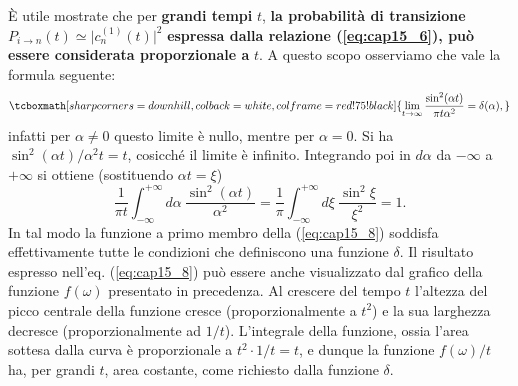 \documentclass[a4paper,12pt,oneside]{book}
\begin{document}
È utile mostrate che per \textbf{grandi tempi} $t$, \textbf{la probabilità di transizione} $P_{i\rightarrow n} (t) \simeq \vert c_n ^{(1)} (t) \vert ^2$ \textbf{espressa dalla relazione (\ref{eq:cap15_6}), può essere considerata proporzionale a } $t$. A questo scopo osserviamo che vale la formula seguente:
	\begin{equation}
		\tcboxmath[sharp corners=downhill, colback=white, colframe=red!75!black]{
			\lim _{t \rightarrow \infty} \frac{\sin ^2 (\alpha t)}{\pi t \alpha ^2} = \delta (\alpha),
			}
	\label{eq:cap15_8}
	\end{equation}
infatti per $\alpha \neq 0$ questo limite è nullo, mentre per  $\alpha = 0$. Si ha $\sin ^2 (\alpha t)/\alpha ^2 t = t$, cosicché il limite è infinito. Integrando poi in $d \alpha$ da $-\infty$ a $+\infty$ si ottiene (sostituendo $\alpha t = \xi$)
	\begin{equation}
		\frac{1}{\pi t}\int _{-\infty} ^{+\infty} d\alpha \ \frac{\sin ^2 (\alpha t)}{ \alpha ^2} = \frac{1}{\pi}\int _{-\infty} ^{+\infty} d\xi \ \frac{\sin ^2 \xi}{ \xi ^2}=1. 
	\end{equation}
In tal modo la funzione a primo membro della (\ref{eq:cap15_8}) soddisfa effettivamente tutte le condizioni che definiscono una funzione $\delta$. Il risultato espresso nell'eq. (\ref{eq:cap15_8}) può essere anche visualizzato dal grafico della funzione $f(\omega)$ presentato in precedenza. Al crescere del tempo $t$ l'altezza del picco centrale della funzione cresce (proporzionalmente a $t^2$) e la sua larghezza decresce (proporzionalmente ad $1/t$). L'integrale della funzione, ossia l'area sottesa dalla curva è proporzionale a $t^2\cdot 1/t =t$, e dunque la funzione $f(\omega)/t$ ha, per grandi $t$, area costante, come richiesto dalla funzione $\delta$.\\
\end{document}
